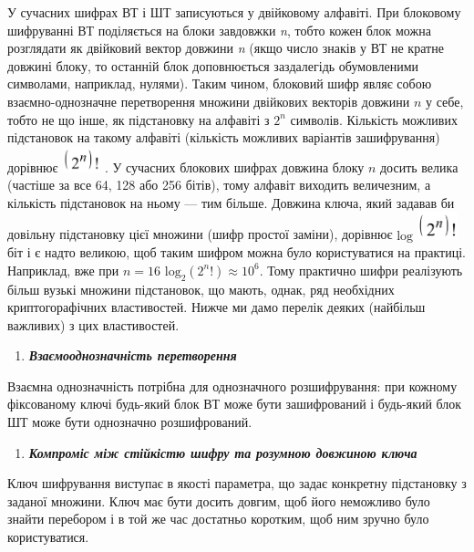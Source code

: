 У сучасних шифрах ВТ і ШТ записуються у двійковому алфавіті. При блоковому
шифруванні ВТ поділяється на блоки завдовжки \textit{n}, тобто кожен блок можна
розглядати як двійковий вектор довжини \textit{n }(якщо число знаків у ВТ не
кратне довжині блоку, то останній блок доповнюється заздалегідь обумовленими
символами, наприклад, нулями). Таким чином, блоковий шифр являє собою
взаємно-однозначне перетворення множини двійкових векторів довжини  ${n}$ у
себе, тобто не що інше, як підстановку на алфавіті з  ${2^{{n}}}$ символів.
Кількість  можливих підстановок на такому алфавіті (кількість можливих
варіантів зашифрування)  дорівнює 
\includegraphics[width=0.4374in,height=0.2909in]{crypt-img/crypt-img292.png} .
У сучасних блокових шифрах довжина блоку  ${n}$ досить велика (частіше за все
64,  128 або 256 бітів), тому алфавіт виходить величезним, а кількість
підстановок на ньому --- тим більше. Довжина ключа, який задавав би довільну
підстановку  цієї множини (шифр простої заміни), дорівнює  ${\text{log}}$
\includegraphics[width=0.4646in,height=0.3134in]{crypt-img/crypt-img293.png} 
біт і є надто великою, щоб таким шифром можна було користуватися на практиці.
Наприклад, вже при  ${n=\text{16}}$   ${\text{log}_{{2}}(2^{{n}}!)\approx
\text{10}^{{6}}}$. Тому практично шифри реалізують більш вузькі множини
підстановок, що мають, однак, ряд необхідних криптогорафічних властивостей.
Нижче ми дамо перелік деяких (найбільш важливих) з цих властивостей.


\bigskip

\liststyleWWviiiNumix
\begin{enumerate}
\item {\bfseries\itshape
Взаємооднозначність перетворення}
\end{enumerate}
 Взаємна однозначність потрібна для однозначного розшифрування: при кожному
фіксованому ключі будь-який блок ВТ може бути зашифрований і будь-який блок ШТ
може бути однозначно розшифрований.


\bigskip

\liststyleWWviiiNumix
\setcounter{saveenum}{\value{enumi}}
\begin{enumerate}
\setcounter{enumi}{\value{saveenum}}
\item {\bfseries\itshape
Компроміс між стійкістю шифру та розумною довжиною  ключа}
\end{enumerate}
 Ключ шифрування виступає в якості параметра, що задає конкретну підстановку з
заданої множини. Ключ має бути досить довгим, щоб його неможливо було знайти
перебором і в той же час достатньо коротким, щоб ним зручно було користуватися.

